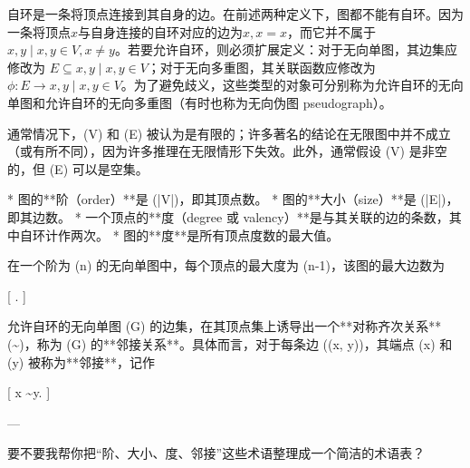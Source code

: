 自环是一条将顶点连接到其自身的边。在前述两种定义下，图都不能有自环。因为一条将顶点$x$与自身连接的自环对应的边为${x,x} = {x}$，而它并不属于${{x,y}\mid x,y \in V, x \neq y}$。若要允许自环，则必须扩展定义：对于无向单图，其边集应修改为
$E \subseteq {{x,y}\mid x,y \in V}$；对于无向多重图，其关联函数应修改为
$\phi : E \to {{x,y}\mid x,y \in V}$。为了避免歧义，这些类型的对象可分别称为允许自环的无向单图和允许自环的无向多重图（有时也称为无向伪图 pseudograph）。

通常情况下，(V) 和 (E) 被认为是有限的；许多著名的结论在无限图中并不成立（或有所不同），因为许多推理在无限情形下失效。此外，通常假设 (V) 是非空的，但 (E) 可以是空集。

* 图的**阶（order）**是 (|V|)，即其顶点数。
* 图的**大小（size）**是 (|E|)，即其边数。
* 一个顶点的**度（degree 或 valency）**是与其关联的边的条数，其中自环计作两次。
* 图的**度**是所有顶点度数的最大值。

在一个阶为 (n) 的无向单图中，每个顶点的最大度为 (n-1)，该图的最大边数为

[
.
]

允许自环的无向单图 (G) 的边集，在其顶点集上诱导出一个**对称齐次关系** (\sim)，称为 (G) 的**邻接关系**。具体而言，对于每条边 ((x, y))，其端点 (x) 和 (y) 被称为**邻接**，记作

[
x \sim y.
]

---

要不要我帮你把“阶、大小、度、邻接”这些术语整理成一个简洁的术语表？
